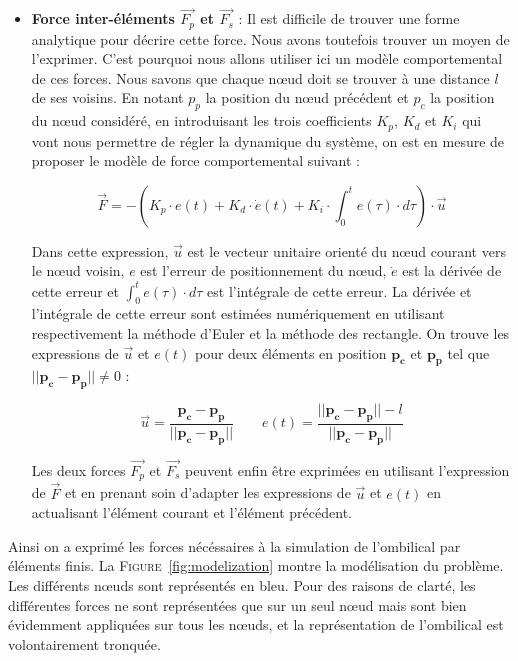\begin{description}
\begin{itemize}
						\item[\textbullet] \textbf{Force inter-éléments $\overrightarrow{F_p}$ et $\overrightarrow{F_s}$} : Il est difficile de trouver une forme analytique pour décrire cette force. Nous avons toutefois trouver un moyen de l'exprimer. C'est pourquoi nous allons utiliser ici un modèle comportemental de ces forces. Nous savons que chaque n\oe ud doit se trouver à une distance $l$ de ses voisins. En notant $p_{p}$ la position du n\oe ud précédent et $p_{c}$ la position du n\oe ud considéré, en introduisant les trois coefficients $K_p$, $K_d$ et $K_i$ qui vont nous permettre de régler la dynamique du système, on est en mesure de proposer le modèle de force comportemental suivant :
						
						\begin{equation}
							\overrightarrow{F} = - \left(K_p \cdot e(t) + K_d \cdot \dot e(t) + K_i \cdot \int_{0}^te(\tau) \cdot d\tau \right) \cdot \overrightarrow{u}
							\label{eq:pid}
						\end{equation}
						
						Dans cette expression, $\overrightarrow{u}$ est le vecteur unitaire orienté du n\oe ud courant vers le n\oe ud voisin, $e$ est l'erreur de positionnement du n\oe ud, $\dot e$ est la dérivée de cette erreur et $\int_{0}^te(\tau) \cdot d\tau$ est l'intégrale de cette erreur. La dérivée et l'intégrale de cette erreur sont estimées numériquement en utilisant respectivement la méthode d'Euler et la méthode des rectangle. On trouve les expressions de $\overrightarrow{u}$ et $e(t)$ pour deux éléments en position $\mathbf{p_c}$ et $\mathbf{p_p}$ tel que $||\mathbf{p_c} - \mathbf{p_p}|| \neq 0$ :

						\begin{equation}
							\overrightarrow{u} = \frac{\mathbf{p_c} - \mathbf{p_p}}{||\mathbf{p_c} - \mathbf{p_p}||} \qquad e(t) = \frac{||\mathbf{p_c} - \mathbf{p_p}|| - l}{||\mathbf{p_c} - \mathbf{p_p}||}
							\label{eq:behavioral}
						\end{equation}
						
						Les deux forces $\overrightarrow{F_p}$ et $\overrightarrow{F_s}$ peuvent enfin être exprimées en utilisant l'expression de $\overrightarrow{F}$ et en prenant soin d'adapter les expressions de $\overrightarrow{u}$ et $e(t)$ en actualisant l'élément courant et l'élément précédent.
					\end{itemize}
				\end{description}
			
				Ainsi on a exprimé les forces nécéssaires à la simulation de l'ombilical par éléments finis. La \textsc{Figure}~\ref{fig:modelization} montre la modélisation du problème. Les différents n\oe uds sont représentés en bleu. Pour des raisons de clarté, les différentes forces ne sont représentées que sur un seul n\oe ud mais sont bien évidemment appliquées sur tous les n\oe uds, et la représentation de l'ombilical est volontairement tronquée.
			
